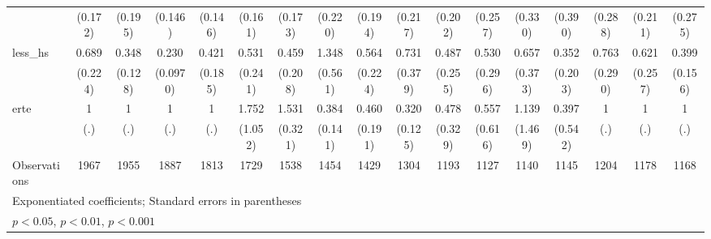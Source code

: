 {\begin{tabular}{l*{16}{c}}
                    &     (0.172)         &     (0.195)         &     (0.146)         &     (0.146)         &     (0.161)         &     (0.173)         &     (0.220)         &     (0.194)         &     (0.217)         &     (0.202)         &     (0.257)         &     (0.330)         &     (0.390)         &     (0.288)         &     (0.211)         &     (0.275)         \\
[1em]
less\_hs             &       0.689         &       0.348\sym{**} &       0.230\sym{***}&       0.421\sym{*}  &       0.531         &       0.459         &       1.348         &       0.564         &       0.731         &       0.487         &       0.530         &       0.657         &       0.352         &       0.763         &       0.621         &       0.399\sym{*}  \\
                    &     (0.224)         &     (0.128)         &    (0.0970)         &     (0.185)         &     (0.241)         &     (0.208)         &     (0.561)         &     (0.224)         &     (0.379)         &     (0.255)         &     (0.296)         &     (0.373)         &     (0.203)         &     (0.290)         &     (0.257)         &     (0.156)         \\
[1em]
erte                &           1         &           1         &           1         &           1         &       1.752         &       1.531\sym{*}  &       0.384\sym{**} &       0.460         &       0.320\sym{**} &       0.478         &       0.557         &       1.139         &       0.397         &           1         &           1         &           1         \\
                    &         (.)         &         (.)         &         (.)         &         (.)         &     (1.052)         &     (0.321)         &     (0.141)         &     (0.191)         &     (0.125)         &     (0.329)         &     (0.616)         &     (1.469)         &     (0.542)         &         (.)         &         (.)         &         (.)         \\
\hline
Observations        &        1967         &        1955         &        1887         &        1813         &        1729         &        1538         &        1454         &        1429         &        1304         &        1193         &        1127         &        1140         &        1145         &        1204         &        1178         &        1168         \\
\hline\hline
\multicolumn{17}{l}{\footnotesize Exponentiated coefficients; Standard errors in parentheses}\\
\multicolumn{17}{l}{\footnotesize \sym{*} \(p<0.05\), \sym{**} \(p<0.01\), \sym{***} \(p<0.001\)}\\
\end{tabular}
}

